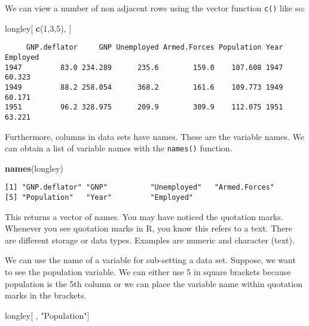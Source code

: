 \documentclass[]{article}
\newenvironment{Shaded}{\begin{snugshade}}{\end{snugshade}}
\newcommand{\DecValTok}[1]{\textcolor[rgb]{0.00,0.00,0.81}{#1}}
\newcommand{\KeywordTok}[1]{\textcolor[rgb]{0.13,0.29,0.53}{\textbf{#1}}}
\newcommand{\NormalTok}[1]{#1}
\newcommand{\StringTok}[1]{\textcolor[rgb]{0.31,0.60,0.02}{#1}}
\begin{document}
We can view a number of non adjacent rows using the vector function \texttt{c()} like so:

\begin{Shaded}
\begin{Highlighting}[]
\NormalTok{longley[ }\KeywordTok{c}\NormalTok{(}\DecValTok{1}\NormalTok{,}\DecValTok{3}\NormalTok{,}\DecValTok{5}\NormalTok{), ]}
\end{Highlighting}
\end{Shaded}

\begin{verbatim}
     GNP.deflator     GNP Unemployed Armed.Forces Population Year Employed
1947         83.0 234.289      235.6        159.0    107.608 1947   60.323
1949         88.2 258.054      368.2        161.6    109.773 1949   60.171
1951         96.2 328.975      209.9        309.9    112.075 1951   63.221
\end{verbatim}

Furthermore, columns in data sets have names. These are the variable names. We can obtain a list of variable names with the \texttt{names()} function.

\begin{Shaded}
\begin{Highlighting}[]
\KeywordTok{names}\NormalTok{(longley)}
\end{Highlighting}
\end{Shaded}

\begin{verbatim}
[1] "GNP.deflator" "GNP"          "Unemployed"   "Armed.Forces"
[5] "Population"   "Year"         "Employed"    
\end{verbatim}

This returns a vector of names. You may have noticed the quotation marks. Whenever you see quotation marks in R, you know this refers to a text. There are different storage or data types. Examples are numeric and character (text).

We can use the name of a variable for sub-setting a data set. Suppose, we want to see the population variable. We can either use 5 in square brackets because population is the 5th column or we can place the variable name within quotation marks in the brackets.

\begin{Shaded}
\begin{Highlighting}[]
\NormalTok{longley[ , }\StringTok{"Population"}\NormalTok{]}
\end{Highlighting}
\end{Shaded}
\end{document}
